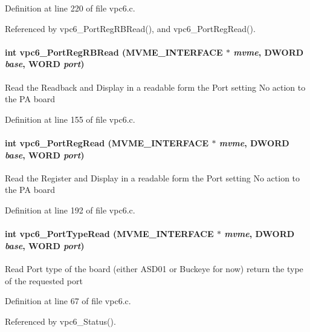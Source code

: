 Definition at line 220 of file vpc6.c.

Referenced by vpc6\_\-PortRegRBRead(), and vpc6\_\-PortRegRead().
\paragraph[{vpc6\_\-PortRegRBRead}]{\setlength{\rightskip}{0pt plus 5cm}int vpc6\_\-PortRegRBRead ({\bf MVME\_\-INTERFACE} $\ast$ {\em mvme}, \/  {\bf DWORD} {\em base}, \/  {\bf WORD} {\em port})}\hfill\label{vpc6_8c_a0d9b6b536c70f925f3abe043310b3f64}
Read the Readback and Display in a readable form the Port setting No action to the PA board 

Definition at line 155 of file vpc6.c.
\paragraph[{vpc6\_\-PortRegRead}]{\setlength{\rightskip}{0pt plus 5cm}int vpc6\_\-PortRegRead ({\bf MVME\_\-INTERFACE} $\ast$ {\em mvme}, \/  {\bf DWORD} {\em base}, \/  {\bf WORD} {\em port})}\hfill\label{vpc6_8c_a03b97f9c9cb620dfa76f19cefacb4f4e}
Read the Register and Display in a readable form the Port setting No action to the PA board 

Definition at line 192 of file vpc6.c.
\paragraph[{vpc6\_\-PortTypeRead}]{\setlength{\rightskip}{0pt plus 5cm}int vpc6\_\-PortTypeRead ({\bf MVME\_\-INTERFACE} $\ast$ {\em mvme}, \/  {\bf DWORD} {\em base}, \/  {\bf WORD} {\em port})}\hfill\label{vpc6_8c_ac870864055cc5eea66f7229a2bd44073}
Read Port type of the board (either ASD01 or Buckeye for now) return the type of the requested port 

Definition at line 67 of file vpc6.c.

Referenced by vpc6\_\-Status().
